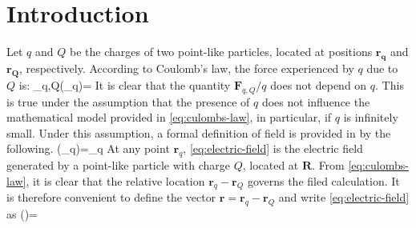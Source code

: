 \section{Introduction}
Let $q$ and $Q$ be the charges of two point-like particles, located at positions $\mathbf{r_{q}}$ and $\mathbf{r_{Q}}$, respectively.
According to Coulomb's law, the force experienced by $q$ due to $Q$ is:
\be\label{eq:culombs-law}
_{q,Q}(_q)=
\ee
It is clear that the quantity $\mathbf{F}_{q,Q}/q$ does not depend on $q$. This is true under the assumption that the presence of $q$ does not influence the mathematical model provided in \ref{eq:culombs-law}, in particular, if $q$ is infinitely small. Under this assumption, a formal definition of field is provided in by the following.
\be\label{eq:electric-field}
(_{q})=\lim_{q } 
\ee
At any point $\mathbf{r}_{q}$, \ref{eq:electric-field} is the electric field generated by a point-like particle with charge $Q$, located at $\mathbf{R}$. From \ref{eq:culombs-law}, it is clear that the relative location $\mathbf{r}_{q}-\mathbf{r}_{Q}$ governs the filed calculation. It is therefore convenient to define the vector $\mathbf{r}=\mathbf{r}_{q}-\mathbf{r}_{Q}$ and write \ref{eq:electric-field} as 
\be\label{eq:electric-field-final}
()=
\ee